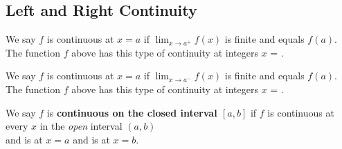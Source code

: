 \documentclass[10pt, addpoints]{exam}
\begin{document}
\begin{questions}
\vspace{-1mm}
\section{Left and Right Continuity}
\vspace{-4mm}
\question We say $f$ is \fillin[left][1in] 
	continuous at $x=a$
	if $\lim_{x\to a^+}f(x)$ is finite 
	and equals $f(a)$.
	\\[2ex]
	The function $f$ above
	has this type of continuity at integers
	$x$ = \fillin[][2in].

\question We say $f$ is \fillin[right][1in] 
	continuous at $x=a$
	if $\lim_{x\to a^-}f(x)$ is finite 
	and equals $f(a)$.
	\\[2ex]
	The function $f$ above
	has this type of continuity at integers
	$x$ = \fillin[][2in].

\question We say $f$ is \textbf{continuous on the closed interval \boldmath $[a,b]$}
	if $f$ is continuous at every $x$ in the \emph{open} interval $(a,b)$
	\\[2ex]
	and is  at $x=a$
	and is  at $x=b$.
%
\end{questions}
\end{document}
